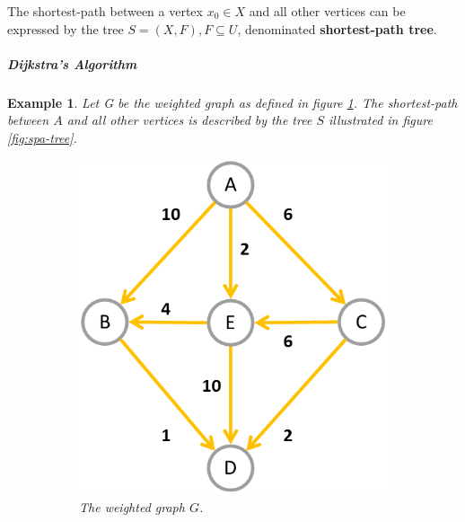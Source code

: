 \documentclass[12pt]{article}
\newtheorem{example}{Example}[section]
\begin{document}
The shortest-path between a vertex $x_0 \in X$ and all other vertices can be expressed by the tree $S=(X, F), F \subseteq U$, denominated \textbf{shortest-path tree}.

\subparagraph{Dijkstra's Algorithm \cite{cor2011}}

\begin{example}
	Let G be the weighted graph as defined in figure \ref{fig:spa-graph}. The shortest-path between $A$ and all other vertices is described by the tree $S$ illustrated in figure \ref{fig:spa-tree}.

	\begin{figure}[H]
		\centering
		\begin{subfigure}{.4\linewidth}
			\includegraphics[width=\linewidth]{graphs/spa-graph}
			\captionsetup{justification=centering}
			\caption{The weighted graph $G$.}
			\label{fig:spa-graph}
		\end{subfigure}
		\begin{subfigure}{.4\linewidth}

\end{subfigure}
\end{figure}
\end{example}
\end{document}

